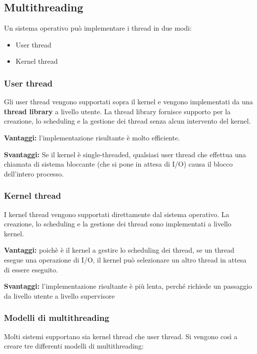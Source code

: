 \subsection{Multithreading}

Un sistema operativo può implementare i thread in due modi:
\begin{itemize}
    \item User thread
    \item Kernel thread
\end{itemize}

\subsubsection{User thread}
Gli user thread vengono supportati sopra il kernel e vengono
implementati da una \textbf{thread library} a livello utente. La thread library fornisce supporto per la creazione, lo scheduling e la gestione dei thread senza alcun intervento del kernel.

\textbf{Vantaggi:} l’implementazione risultante è molto efficiente.
\newline

\textbf{Svantaggi:} Se il kernel è single-threaded, qualsiasi user thread che effettua una chiamata di sistema bloccante (che si pone in attesa di I/O) causa il blocco dell’intero processo.

\subsubsection{Kernel thread}
I kernel thread vengono supportati direttamente dal sistema
operativo. La creazione, lo scheduling e la gestione dei thread sono implementati a livello kernel.

\textbf{Vantaggi:} poichè è il kernel a gestire lo scheduling dei thread, se un thread esegue una operazione di I/O, il kernel può selezionare un altro thread in attesa di essere eseguito.
\newline

\textbf{Svantaggi:} l’implementazione risultante è più lenta, perché richiede un passaggio da
livello utente a livello supervisore

\subsubsection{Modelli di multithreading}
Molti sistemi supportano sia kernel thread che user thread.
Si vengono così a creare tre differenti modelli di multithreading:

